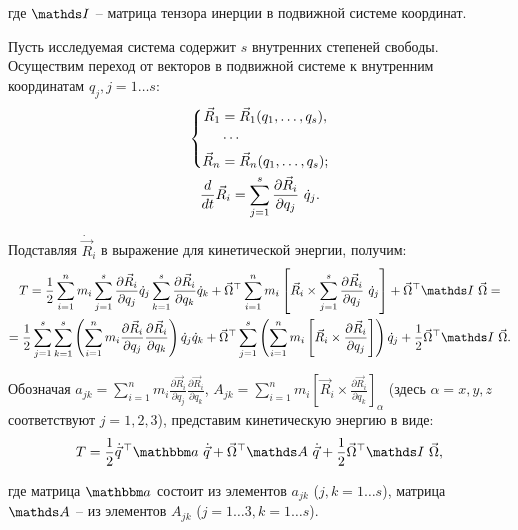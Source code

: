 \vlevo где $\bbI$ -- матрица тензора инерции в подвижной системе координат.

Пусть исследуемая система содержит $s$ внутренних степеней свободы. Осуществим переход от векторов в подвижной системе к внутренним координатам $q_j, j=1 \dots s$:
\vverh
\begin{gather}
\left\{
\begin{aligned}
\vec{R}_1 &= \vec{R}_1 (q_1, \dots, q_s), \\
&\cdots \\
\vec{R}_n &= \vec{R}_n (q_1, \dots, q_s);
\end{aligned}
\right. \notag \\
\frac{d}{dt} \vec{R}_i = \sum_{j=1}^{s} \frac{\partial \vec{R}_i}{\partial q_j} \ \dot{q}_j \notag .
\end{gather}

Подставляя $\dot{\vec{R}}_i$ в выражение для кинетической энергии, получим:
\vverh
\begin{gather}
T = \frac{1}{2} \sum_{i=1}^{n} m_i \sum_{j=1}^{s} \frac{\partial \vec{R}_i}{\partial q_j} \dot{q}_j \sum_{k=1}^{s} \frac{\partial \vec{R}_i}{\partial q_k} \dot{q}_k + \vec{\Omega}^\top \sum_{i=1}^{n} m_i \left[ \vec{R}_i \times \sum_{j=1}^{s} \frac{\partial \vec{R}_i}{\partial q_j} \ \dot{q}_j \right] + \vec{\Omega}^\top \bbI \ \vec{\Omega} = \notag \\
= \frac{1}{2} \sum_{j=1}^{s} \sum_{k=1}^{s} \left( \sum_{i=1}^{n} m_i \frac{\partial \vec{R}_i}{\partial q_j} \frac{\partial \vec{R}_i}{\partial q_k} \right) \dot{q}_j \dot{q}_k + \vec{\Omega}^\top \sum_{j=1}^{s} \left( \sum_{i=1}^{n} m_i \left[ \vec{R}_i \times \frac{\partial \vec{R}_i}{\partial q_j} \right] \right) \dot{q}_j + \frac{1}{2} \vec{\Omega}^\top \bbI \ \vec{\Omega} \notag .
\end{gather}

Обозначая $a_{jk} = \sum_{i=1}^{n} m_i \frac{\partial \vec{R}_i}{\partial q_j} \frac{\partial \vec{R}_i}{\partial q_k}$, $A_{jk} = \sum_{i=1}^{n} m_i \left[ \vec{R}_i \times \frac{\partial \vec{R}_i}{\partial q_k} \right]_{\alpha}$ (здесь $\alpha = x,y,z$ соответствуют $j=1,2,3$), представим кинетическую энергию в виде:
\vverh
\begin{gather}
T = \frac{1}{2} \dot{\vec{q}}^{\, \top} \bba \ \dot{\vec{q}} + \vec{\Omega}^\top \bbA \ \dot{\vec{q}} + \frac{1}{2} \vec{\Omega}^\top \bbI \ \vec{\Omega} \notag ,
\end{gather}

\vlevo где матрица $\bba$ состоит из элементов $a_{jk}$ ($j,k = 1 \dots s$), матрица $\bbA$ -- из элементов $A_{jk}$ ($j = 1 \dots 3, k = 1 \dots s$).


